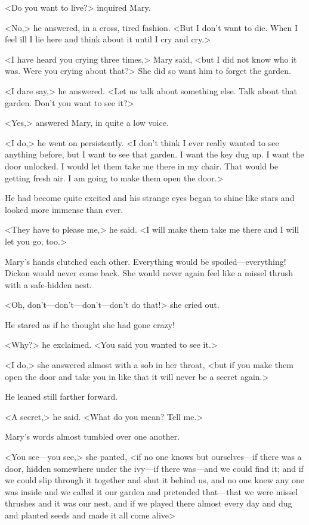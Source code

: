 <Do you want to live?> inquired Mary.

<No,> he answered, in a cross, tired fashion. <But I don't want to die. When I feel ill I lie here and think about it until I cry and cry.>

<I have heard you crying three times,> Mary said, <but I did not know who it was. Were you crying about that?> She did so want him to forget the garden.

<I dare say,> he answered. <Let us talk about something else. Talk about that garden. Don't you want to see it?>

<Yes,> answered Mary, in quite a low voice.

<I do,> he went on persistently. <I don't think I ever really wanted to see anything before, but I want to see that garden. I want the key dug up. I want the door unlocked. I would let them take me there in my chair. That would be getting fresh air. I am going to make them open the door.>

He had become quite excited and his strange eyes began to shine like stars and looked more immense than ever.

<They have to please me,> he said. <I will make them take me there and I will let you go, too.>

Mary's hands clutched each other. Everything would be spoiled—everything! Dickon would never come back. She would never again feel like a missel thrush with a safe-hidden nest.

<Oh, don't—don't—don't—don't do that!> she cried out.

He stared as if he thought she had gone crazy!

<Why?> he exclaimed. <You said you wanted to see it.>

<I do,> she answered almost with a sob in her throat, <but if you make them open the door and take you in like that it will never be a secret again.>

He leaned still farther forward.

<A secret,> he said. <What do you mean? Tell me.>

Mary's words almost tumbled over one another.

<You see—you see,> she panted, <if no one knows but ourselves—if there was a door, hidden somewhere under the ivy—if there was—and we could find it; and if we could slip through it together and shut it behind us, and no one knew any one was inside and we called it our garden and pretended that—that we were missel thrushes and it was our nest, and if we played there almost every day and dug and planted seeds and made it all come alive\longdash>

